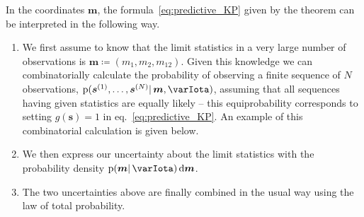 \documentclass[\ifafour a4paper,12pt,\else a5paper,10pt,\fi%
onecolumn,oneside,article,%
british%
]{memoir}
\theoremstyle{remark}
\theoremstyle{innote}
\newcommand*{\di}{\mathrm{d}}%
\newcommand*{\defd}{\coloneqq}
\newcommand*{\pf}{\mathrm{p}}%
\renewcommand*{\|}{\mathpunct{|}}
\newcommand*{\eqn}{eq.}%
\newcommand*{\yI}{\varIota}
\newcommand*{\ys}{\bm{s}}
\newcommand*{\yso}[1]{\ys^{(#1)}}
\newcommand*{\yt}{\bm{m}}
\newcommand*{\yl}{m_{12}}
\begin{document}
\bigskip

In the coordinates $\yt$, the formula~\eqref{eq:predictive_KP} given
by the theorem can be interpreted in the following way.
\begin{enumerate}%
\item We first assume to know that the limit statistics in a very large
  number of observations is $\yt \defd (m_1, m_2, \yl)$. Given this knowledge
  we can combinatorially calculate the probability of observing a finite
  sequence of $N$ observations, $\pf(\yso{1}, \dotsc, \yso{N} \|\yt,\yI)$,
  assuming that all sequences having given statistics are equally likely --
  this equiprobability corresponds to setting $g(\ys)=1$ in
  \eqn~\eqref{eq:predictive_KP}. An example of this combinatorial
  calculation is given below.
\item We then express our uncertainty about the limit statistics with the
  probability density $\pf(\yt \| \yI)\,\di\yt$.
\item The two uncertainties above are finally combined in the usual way
  using the law of total probability.
\end{enumerate}

\smallskip
\end{document}
